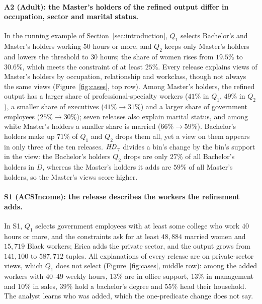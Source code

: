\paragraph{A2 (Adult): the Master's holders of the refined output differ in occupation, sector and marital status.}
In the running example of Section~\ref{sec:introduction}, $Q_1$ selects Bachelor's and Master's holders working $50$ hours or more, and $Q_2$ keeps only Master's holders and lowers the threshold to $30$ hours; the share of women rises from $19.5\%$ to $30.6\%$, which meets the constraint of at least $25\%$.
Every release explains views of Master's holders by occupation, relationship and workclass, though not always the same views (Figure~\ref{fig:cases}, top row).
Among Master's holders, the refined output has a larger share of professional-specialty workers ($41\%$ in $Q_1$, $49\%$ in $Q_2$), a smaller share of executives ($41\%\rightarrow31\%$) and a larger share of government employees ($25\%\rightarrow30\%$); seven releases also explain marital status, and among white Master's holders a smaller share is married ($66\%\rightarrow59\%$).
Bachelor's holders make up $71\%$ of $Q_1$ and $Q_2$ drops them all, yet a view on them appears in only three of the ten releases.
$\mathit{HD}_\gamma$ divides a bin's change by the bin's support in the view: the Bachelor's holders $Q_2$ drops are only $27\%$ of all Bachelor's holders in $D$, whereas the Master's holders it adds are $59\%$ of all Master's holders, so the Master's views score higher.


\paragraph{S1 (ACSIncome): the release describes the workers the refinement adds.}
In S1, $Q_1$ selects government employees with at least some college who work $40$ hours or more, and the constraints ask for at least $48{,}884$ married women and $15{,}719$ Black workers; Erica adds the private sector, and the output grows from $141{,}100$ to $587{,}712$ tuples.
All explanations of every release are on private-sector views, which $Q_1$ does not select (Figure~\ref{fig:cases}, middle row): among the added workers with $40$--$49$ weekly hours, $13\%$ are in office support, $13\%$ in management and $10\%$ in sales, $39\%$ hold a bachelor's degree and $55\%$ head their household.
The analyst learns who was added, which the one-predicate change does not say.


